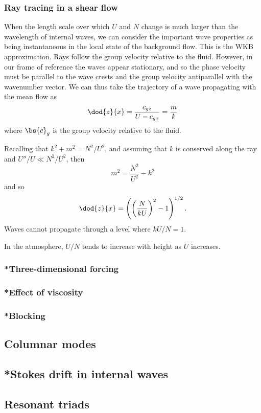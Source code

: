 \subsubsection{Ray tracing in a shear flow}

When the length scale over which $U$ and $N$ change is much larger than the wavelength of internal waves, we can consider the important wave properties as being instantaneous in the local state of the background flow. This is the WKB approximation. Rays follow the group velocity relative to the fluid. However, in our frame of reference the waves appear stationary, and so the phase velocity must be parallel to the wave crests and the group velocity antiparallel with the wavenumber vector. We can thus take the trajectory of a wave propagating with the mean flow as
\begin{equation}
	\dod{z}{x} = \frac{c_{gz}}{U - c_{gx}} = \frac{m}{k}
\end{equation}
where $\bs{c}_g$ is the group velocity relative to the fluid.

Recalling that $k^2 + m^2 = N^2 / U^2$, and assuming that $k$ is conserved along the ray and $U''/U \ll N^2 /U^2$, then
\begin{equation}
	m^2 = \frac{N^2}{U^2} - k^2
\end{equation}
and so 
\begin{equation}
	\dod{z}{x} = \left(\left(\frac{N}{kU}\right)^2 - 1\right)^{1/2}.
\end{equation}
Waves cannot propagate through a level where $kU/N = 1$.

In the atmosphere, $U/N$ tends to increase with height as $U$ increases.

\subsubsection{*Three-dimensional forcing}
\subsubsection{*Effect of viscosity}
\subsubsection{*Blocking}

\subsection{Columnar modes}
\subsection{*Stokes drift in internal waves}
\subsection{Resonant triads}
